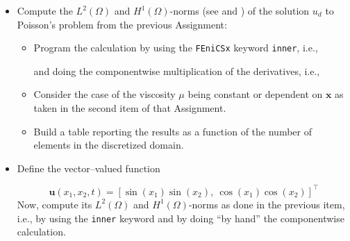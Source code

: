 \begin{kaobox}[frametitle=Implement a script that]

\begin{itemize}

\item Compute the $L^2(\Omega)$ and $H^1(\Omega)$-norms (see  and )
of the solution $u_d$ to Poisson's problem from the previous Assignment:
\begin{itemize}
\item Program the calculation by using the \texttt{FEniCSx} keyword \texttt{inner}, i.e.,
\vspace{-0.05cm}
\begin{center}
\begin{minipage}{0.825\textwidth}
    
\end{minipage}
\end{center}
and doing the componentwise multiplication of the derivatives, i.e.,
\vspace{-0.05cm}
\begin{center}
\begin{minipage}{0.825\textwidth}
    
\end{minipage}
\end{center}
\item Consider the case of the viscosity
$\mu$ being constant or dependent on $\mathbf{x}$ as taken
in the second item of that Assignment.
\item Build a table reporting the results as a function of the number of elements
in the discretized domain.
\end{itemize}

\item Define the vector--valued function

\begin{equation}
\mathbf{u}(x_1,x_2,t) = \left [ \sin(x_1)\sin(x_2), ~\cos(x_1)\cos(x_2)\right]^{\intercal}
\end{equation}
Now, compute its $L^2(\Omega)$ and $H^1(\Omega)$-norms as done in the previous item, i.e.,
by using the \texttt{inner}
keyword and by doing ``by hand'' the componentwise calculation.\\


\end{itemize}
\end{kaobox}
